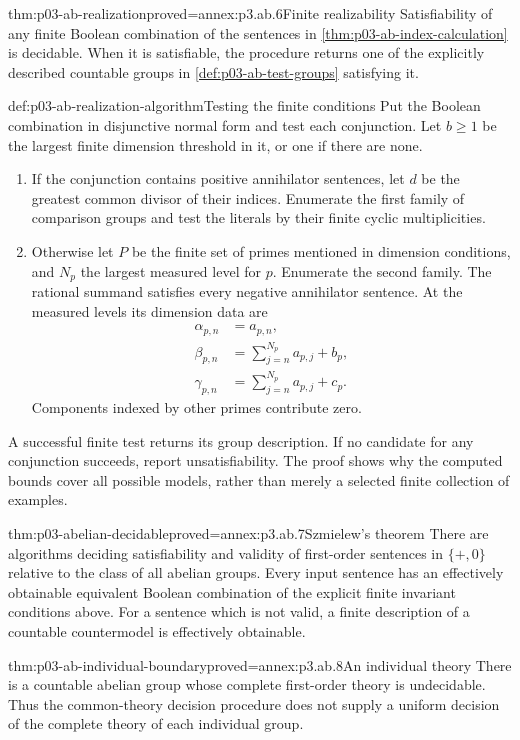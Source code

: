 \begin{hbtheorem}{thm:p03-ab-realization}{proved=annex:p3.ab.6}{Finite realizability}
Satisfiability of any finite Boolean combination of the sentences in
\cref{thm:p03-ab-index-calculation} is decidable. When it is satisfiable,
the procedure returns one of the explicitly described countable groups
in \cref{def:p03-ab-test-groups} satisfying it.
\end{hbtheorem}

\begin{hbmethod}{def:p03-ab-realization-algorithm}{Testing the finite conditions}
Put the Boolean combination in disjunctive normal form and test each
conjunction. Let \(b\geq1\) be the largest finite dimension threshold
in it, or one if there are none.
\begin{enumerate}
 \item If the conjunction contains positive annihilator sentences,
       let \(d\) be the greatest common divisor of their indices.
       Enumerate the first family of comparison groups and test the
       literals by their finite cyclic multiplicities.
 \item Otherwise let \(P\) be the finite set of primes mentioned in
       dimension conditions, and \(N_p\) the largest measured level
       for \(p\). Enumerate the second family. The rational summand
       satisfies every negative annihilator sentence. At the measured
       levels its dimension data are
       \[
       \begin{aligned}
       \alpha_{p,n}&=a_{p,n},\\
       \beta_{p,n}&=\sum_{j=n}^{N_p}a_{p,j}+b_p,\\
       \gamma_{p,n}&=\sum_{j=n}^{N_p}a_{p,j}+c_p.
       \end{aligned}
       \]
       Components indexed by other primes contribute zero.
\end{enumerate}
A successful finite test returns its group description. If no candidate
for any conjunction succeeds, report unsatisfiability. The proof shows
why the computed bounds cover all possible models, rather than merely
a selected finite collection of examples.
\end{hbmethod}

\begin{hbtheorem}{thm:p03-abelian-decidable}{proved=annex:p3.ab.7}{Szmielew's theorem}
There are algorithms deciding satisfiability and validity of first-order
sentences in \(\{+,0\}\) relative to the class of all abelian groups.
Every input sentence has an effectively obtainable equivalent Boolean
combination of the explicit finite invariant conditions above.
For a sentence which is not valid, a finite description of a countable
countermodel is effectively obtainable.
\end{hbtheorem}

\begin{hblemma}{thm:p03-ab-individual-boundary}{proved=annex:p3.ab.8}{An individual theory}
There is a countable abelian group whose complete first-order theory
is undecidable. Thus the common-theory decision procedure does not
supply a uniform decision of the complete theory of each individual group.
\end{hblemma}
